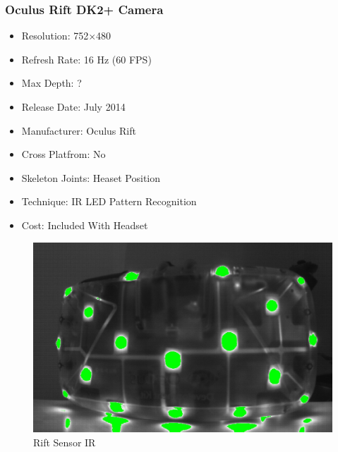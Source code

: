\documentclass[a4paper,10pt,twoside]{article}
\begin{document}
\subsubsection{Oculus Rift DK2+ Camera}
\begin{itemize}
  \item Resolution: 752×480
  \item Refresh Rate: 16 Hz (60 FPS)
  \item Max Depth: ?
  \item Release Date: July 2014
  \item Manufacturer: Oculus Rift
  \item Cross Platfrom: No
  \item Skeleton Joints: Heaset Position
  \item Technique: IR LED Pattern Recognition
  \item Cost: Included With Headset
\end{itemize}
\begin{figure}[H]
	\includegraphics[width=\linewidth,height=\paperheight,keepaspectratio]{riftIR.jpg}
	\caption{Rift Sensor IR}
	\label{fig:riftCam}
	\end{figure}
	\pagebreak
\end{document}
